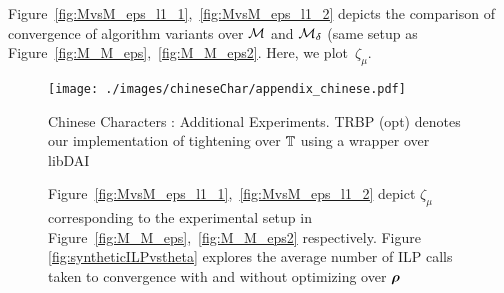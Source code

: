 Figure~\ref{fig:MvsM_eps_l1_1},~\ref{fig:MvsM_eps_l1_2} depicts the comparison of convergence of algorithm variants 
over $\mathcal{M}$ and $\mathcal{M}_{\delta}$ (same setup as Figure~\ref{fig:M_M_eps},~\ref{fig:M_M_eps2}. Here, we plot~$\zeta_{\mu}$.
%
%
%
%
%
%
%
%
%
%
%
%
%

\begin{figure}
\centering
\texttt{[image: ./images/chineseChar/appendix\_chinese.pdf]}
\caption{Chinese Characters : Additional Experiments. TRBP (opt) denotes our implementation of tightening over $\mathbb{T}$ using a wrapper over libDAI~\citep{Mooij_libDAI_10}}
\label{fig:chineseChar_appendix}
\end{figure}

\begin{figure}
\centering
{}
\centering
{}
\centering
{}
\caption{Figure~\ref{fig:MvsM_eps_l1_1},~\ref{fig:MvsM_eps_l1_2} depict $\zeta_{\mu}$ corresponding to the experimental setup in Figure~\ref{fig:M_M_eps},~\ref{fig:M_M_eps2} respectively. Figure \ref{fig:syntheticILPvstheta} explores the average number of ILP calls taken to convergence with and without optimizing over $\bm{\rho}$} 
\vspace{-3mm}
\end{figure}
